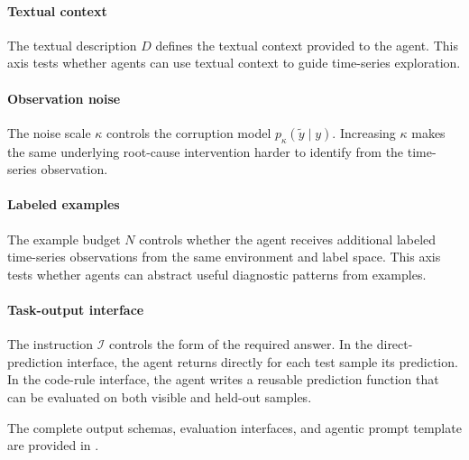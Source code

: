 \paragraph{Textual context}
The textual description \(D\) defines the textual context provided to the agent.
This axis tests whether agents can use textual context to guide time-series exploration.

\paragraph{Observation noise}
The noise scale \(\kappa\) controls the corruption model \(p_\kappa(\tilde{y} \mid y)\). 
Increasing \(\kappa\) makes the same underlying root-cause intervention harder to identify from the time-series observation.

\paragraph{Labeled examples}
The example budget \(N\) controls whether the agent receives additional labeled time-series observations from the same environment and label space. 
This axis tests whether agents can abstract useful diagnostic patterns from examples.

\paragraph{Task-output interface}
The instruction \(\mathcal{I}\) controls the form of the required answer. 
In the direct-prediction interface, the agent returns directly for each test sample its prediction.
In the code-rule interface, the agent writes a reusable prediction function that can be evaluated on both visible and held-out samples. 

The complete output schemas, evaluation interfaces, and agentic prompt template are provided in .

